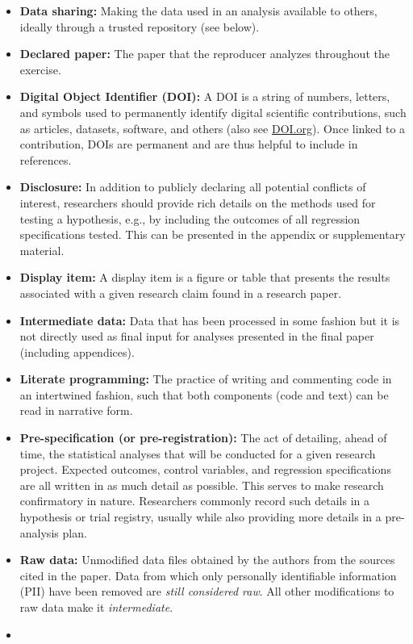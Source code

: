 \documentclass[
]{book}
\begin{document}
\begin{itemize}
\item
  \textbf{Data sharing:} Making the data used in an analysis available to others, ideally through a trusted repository (see below).
\item
  \textbf{Declared paper:} The paper that the reproducer analyzes throughout the exercise.
\item
  \textbf{Digital Object Identifier (DOI):} A DOI is a string of numbers, letters, and symbols used to permanently identify digital scientific contributions, such as articles, datasets, software, and others (also see \href{https://www.doi.org/}{DOI.org}). Once linked to a contribution, DOIs are permanent and are thus helpful to include in references.
\item
  \textbf{Disclosure:} In addition to publicly declaring all potential conflicts of interest, researchers should provide rich details on the methods used for testing a hypothesis, e.g., by including the outcomes of all regression specifications tested. This can be presented in the appendix or supplementary material.
\item
  \textbf{Display item:} A display item is a figure or table that presents the results associated with a given research claim found in a research paper.
\item
  \textbf{Intermediate data:} Data that has been processed in some fashion but it is not directly used as final input for analyses presented in the final paper (including appendices).
\item
  \textbf{Literate programming:} The practice of writing and commenting code in an intertwined fashion, such that both components (code and text) can be read in narrative form.
\item
  \textbf{Pre-specification (or pre-registration):} The act of detailing, ahead of time, the statistical analyses that will be conducted for a given research project. Expected outcomes, control variables, and regression specifications are all written in as much detail as possible. This serves to make research confirmatory in nature.
  Researchers commonly record such details in a hypothesis or trial registry, usually while also providing more details in a pre-analysis plan.
\item
  \textbf{Raw data:} Unmodified data files obtained by the authors from the sources cited in the paper. Data from which only personally identifiable information (PII) have been removed are \emph{still considered raw}. All other modifications to raw data make it \emph{intermediate}.
\item

\end{itemize}
\end{document}
